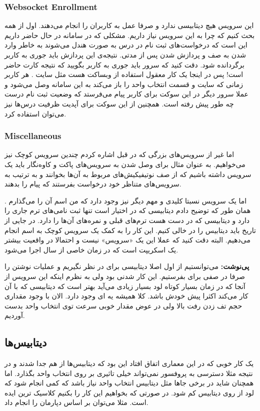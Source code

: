 \subsubsection{Websocket Enrollment}
این سرویس هیچ دیتابیسی ندارد و صرفا عمل
به کاربران را انجام می‌دهند. اول از همه بحث کنیم که چرا به این سرویس نیاز داریم.
مشکلی که در سامانه در حال حاضر داریم این است که درخواست‌های ثبت نام در درس به صورت
هندل می‌شوند به خاطر وارد شدن به صف و پردازش شدن پس از مدتی. نتیجه‌ی این پردازش باید جوری به کاربر
برگردانده شود. دقت کنید که سرور باید جوری به کاربر بگویید که نتیجه کارت حاضر است!
پس در اینجا یک کار معقول استفاده از وبساکت هست مثل سایت
.
هر کاربر زمانی که سایت و قسمت انتخاب واحد را باز می‌کند به این سامانه وصل می‌شود و عملا سرور دیگر
در این سوکت برای کاربر پیام می‌فرستد که وضعیت ثبت نام درست چه طور پیش رفته است.
همچنین از این سوکت برای آپدیت ظرفیت درس‌ها نیز می‌توان استفاده کرد.
\subsubsection{Miscellaneous}
اما غیر از سرویس‌های بزرگی که در قبل اشاره کردم چندین سرویس کوچک نیز می‌خواهیم. به عنوان مثال برای وصل شدن
به سرویس‌های پاکت و کاوه‌نگار باید یک سرویس داشته باشیم که از صف نوتیفیکیش‌های مربوط به آن‌ها بخوانند
و به ترتیب به سرویس‌های متناظر خود درخواست بفرستند که پیام را بدهند.

اما یک سرویس نسبتا کلیدی و مهم دیگر نیز وجود دارد که من اسم آن را می‌گذارم
.
همان طور که توضیح دادم دیتابیسی که در اختیار
است تنها ثبت نامی‌های ترم جاری را دارد و دیتابیسی که در دست
هست ترم‌های قبلی و نمره‌های آن‌ها را دارد. در جایی از تاریخ باید دیتابیس
 را در  خالی کنیم.
این کار را به کمک یک سرویس کوچک به اسم
انجام می‌دهیم. البته دقت کنید که عملا این یک
«سرویس»
نیست و احتمالا در واقعیت بیشتر یک اسکریپت است که در زمان خاصی از سال اجرا می‌شود.

\textbf{پی‌نوشت:}
می‌توانستیم از اول اصلا دیتابیسی برای
در نظر نگیریم و عملیات نوشتن را صرفا در صفی برای
بفرستیم. این کار شدنی بود ولی به نظرم اینکه این سرویس از آنجا که در زمان بسیار کوتاه لود بسیار زیادی
می‌آید بهتر است که دیتابیسی که با آن کار می‌کند اکثرا پیش خودش باشد. کلا همیشه یه
ای
وجود دارد. الان با وجود
مقداری حجم تف زدن رفت بالا ولی در عوض مقدار خوبی سرعت توی انتخاب واحد بدست آوردیم.

\subsection{دیتابیس‌ها}
یک کار خوبی که در این معماری اتفاق افتاد این بود که دیتابیس‌ها از هم جدا شدند و در نتیجه
مثلا دسترسی به پروفسور نمی‌تواند خیلی تاثیری بر روی انتخاب واحد بگذارد. اما همچنان شاید در
برخی جا‌ها مثل دیتابیس انتخاب واحد نیاز باشد که کمی
انجام شود که لود از روی دیتابیس کم شود. در صورتی که بخواهیم این کار را بکنیم کلاسیک ترین ایده
است. مثلا می‌توان بر اساس دپارمان
را انجام داد.

